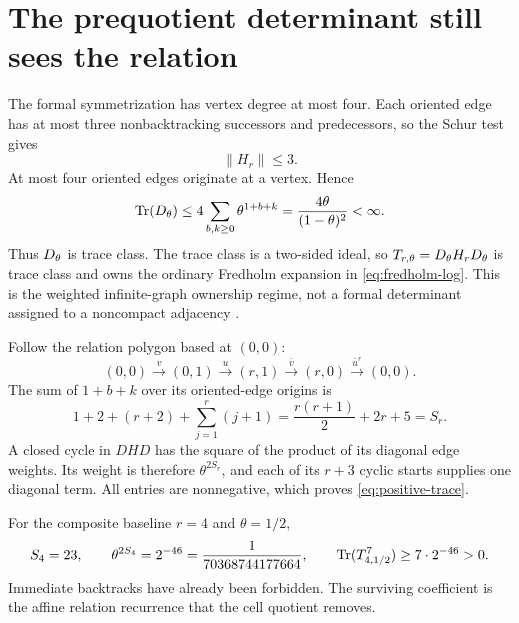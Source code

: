 \section{The prequotient determinant still sees the relation}
\label{sec:operator}

The formal symmetrization has vertex degree at most four.  Each oriented edge
has at most three nonbacktracking successors and predecessors, so the Schur
test gives
\begin{equation}
\|H_r\|\le3.
\label{eq:H-bound}
\end{equation}
At most four oriented edges originate at a vertex.  Hence
\begin{equation}
\operatorname{Tr}(D_{\theta})
\le4\sum_{b,k\ge0}\theta^{1+b+k}
=\frac{4\theta}{(1-\theta)^2}<\infty.
\label{eq:D-trace}
\end{equation}
Thus $D_{\theta}$ is trace class.  The trace class is a two-sided ideal, so
$T_{r,\theta}=D_{\theta} H_rD_{\theta}$ is trace class and owns the ordinary Fredholm
expansion in \cref{eq:fredholm-log}.  This is the weighted infinite-graph
ownership regime, not a formal determinant assigned to a noncompact adjacency
\citep{Deitmar2015}.

Follow the relation polygon based at $(0,0)$:
\[
(0,0)\xrightarrow{v}(0,1)\xrightarrow{u}(r,1)
\xrightarrow{\bar v}(r,0)\xrightarrow{\bar u^r}(0,0).
\]
The sum of $1+b+k$ over its oriented-edge origins is
\begin{equation}
1+2+(r+2)+\sum_{j=1}^r(j+1)
=\frac{r(r+1)}2+2r+5=S_r.
\label{eq:cycle-exponent}
\end{equation}
A closed cycle in $DHD$ has the square of the product of its diagonal edge
weights.  Its weight is therefore $\theta^{2S_r}$, and each of its $r+3$
cyclic starts supplies one diagonal term.  All entries are nonnegative, which
proves \cref{eq:positive-trace}.

For the composite baseline $r=4$ and $\theta=1/2$,
\[
S_4=23,
\qquad
\theta^{2S_4}=2^{-46}
=\frac{1}{70368744177664},
\qquad
\operatorname{Tr}(T_{4,1/2}^7)\ge7\cdot2^{-46}>0.
\]
Immediate backtracks have already been forbidden.  The surviving coefficient
is the affine relation recurrence that the cell quotient removes.

